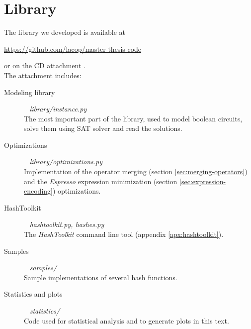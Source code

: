 \chapter{Library}
\label{apx:library}

The library  we developed is available at
\begin{center}
\url{https://github.com/lacop/master-thesis-code}
\end{center}
or on the CD attachment \citep{papay2016code}.
~\\

\noindent The attachment includes:
\begin{description}
\item[Modeling library] ~ \emph{library/instance.py} \\
The most important part of the library, used to model boolean circuits, solve them using SAT solver and read the solutions.

\item[Optimizations] ~ \emph{library/optimizations.py} \\
Implementation of the operator merging (section \ref{sec:merging-operators}) and the \emph{Espresso} expression minimization (section \ref{sec:expression-encoding}) optimizations.

\item[HashToolkit] ~ \emph{hashtoolkit.py, hashes.py} \\
The \emph{HashToolkit} command line tool (appendix \ref{apx:hashtoolkit}).

\item[Samples] ~ \emph{samples/} \\
Sample implementations of several hash functions.

\item[Statistics and plots] ~ \emph{statistics/} \\
Code used for statistical analysis and to generate plots in this text.
\end{description}